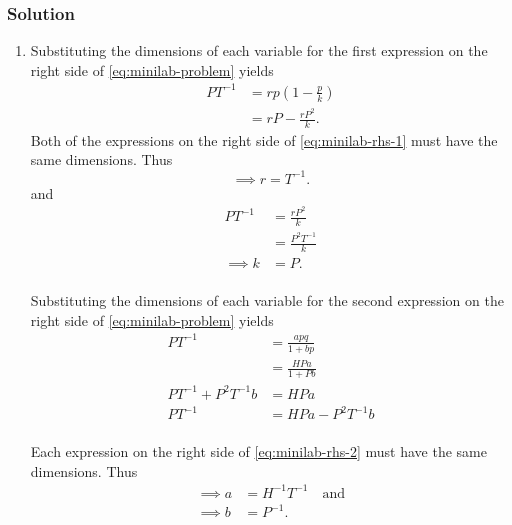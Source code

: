 \documentclass[12pt,twoside]{article}
\begin{document}
\subsubsection*{Solution}
\begin{enumerate}
\item Substituting the dimensions of each variable for the first expression on
  the right side of \cref{eq:minilab-problem} yields
  \begin{equation}
    \label{eq:minilab-rhs-1}
    \begin{aligned}
      PT^{-1} &= rp(1-\frac{p}{k}) \\
      &= rP - \frac{rP^2}{k}.
    \end{aligned}
  \end{equation}
  Both of the expressions on the right side of \cref{eq:minilab-rhs-1} must have
  the same dimensions. Thus
  $$\implies r=T^{-1}.$$ and
  \begin{equation*}
    \begin{aligned}
      PT^{-1} &= \frac{rP^2}{k} \\
      &= \frac{P^2T^{-1}}{k} \\
      \implies k&= P. \\
    \end{aligned}
  \end{equation*}

  Substituting the dimensions of each variable for the second expression on the
  right side of \cref{eq:minilab-problem} yields
  \begin{equation}
    \label{eq:minilab-rhs-2}
    \begin{aligned}
      PT^{-1} &= \frac{apq}{1+bp} \\
      &= \frac{HPa}{1+Pb} \\
      PT^{-1}+P^2T^{-1}b &= HPa \\
      PT^{-1} &= HPa - P^2T^{-1}b \\
    \end{aligned}
  \end{equation}

  Each expression on the right side of \cref{eq:minilab-rhs-2} must have the
  same dimensions. Thus
  \begin{equation*}
    \begin{aligned}
      \implies a&=H^{-1}T^{-1} \quad\text{and} \\
      \implies b&=P^{-1}. \\
    \end{aligned}
  \end{equation*}


\end{enumerate}
\end{document}
